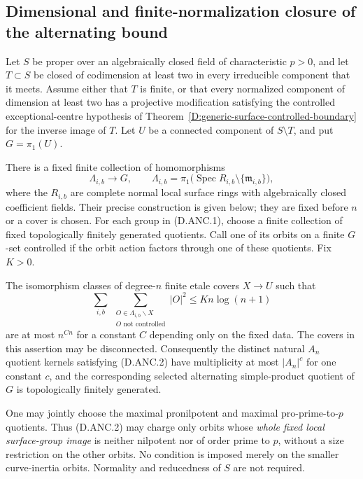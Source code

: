 \subsection{Dimensional and finite-normalization closure of the alternating bound}

\begin{corollary}
\label{D:alternating-dimensional-normalization-closure}
Let $S$ be proper over an algebraically closed field of characteristic
$p>0$, and let $T\subset S$ be closed of codimension at least two
in every irreducible component that it meets. Assume either that
$T$ is finite, or that every normalized component of dimension at
least two has a projective modification satisfying the controlled
exceptional-centre hypothesis of
Theorem~\ref{D:generic-surface-controlled-boundary} for the inverse
image of $T$. Let $U$ be a connected component of $S\setminus T$,
and put $G=\pi_1(U)$.

There is a fixed finite collection of homomorphisms
\[
 \Lambda_{i,b}\longrightarrow G,\qquad
 \Lambda_{i,b}=\pi_1\bigl(\operatorname{Spec}R_{i,b}
                                      \setminus\{\mathfrak m_{i,b}\}\bigr),
                                                               \tag{D.ANC.1}
\]
where the $R_{i,b}$ are complete normal local surface rings with
algebraically closed coefficient fields. Their precise construction
is given below; they are fixed before $n$ or a cover is chosen.
For each group in (D.ANC.1), choose a finite collection of fixed
topologically finitely generated quotients. Call one of its orbits
on a finite $G$-set controlled if the orbit action factors through
one of these quotients. Fix $K>0$.

The isomorphism classes of degree-$n$ finite etale covers $X\to U$
such that
\[
 \sum_{i,b}\ 
 \sum_{\substack{O\in\Lambda_{i,b}\backslash X\\
                         O\text{ not controlled}}}|O|^2
                              \le K n\log(n+1)            \tag{D.ANC.2}
\]
are at most $n^{C n}$ for a constant $C$ depending only on the
fixed data. The covers in this assertion may be disconnected.
Consequently the distinct natural $A_n$ quotient kernels satisfying
(D.ANC.2) have multiplicity at most $|A_n|^c$ for one constant $c$,
and the corresponding selected alternating simple-product quotient
of $G$ is topologically finitely generated.

One may jointly choose the maximal pronilpotent and maximal
pro-prime-to-$p$ quotients. Thus (D.ANC.2) may charge only orbits
whose \emph{whole fixed local surface-group image} is neither
nilpotent nor of order prime to $p$, without a size restriction
on the other orbits. No condition is imposed merely on the smaller
curve-inertia orbits. Normality and reducedness of $S$ are not
required.
\end{corollary}

